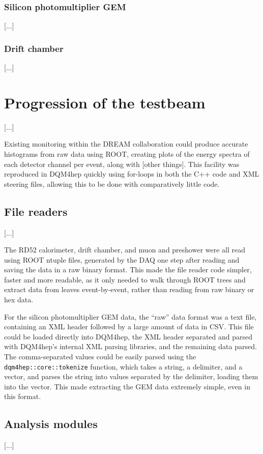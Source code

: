 \subsubsection{Silicon photomultiplier GEM}
[...]

\subsubsection{Drift chamber}
[...]

\section{Progression of the testbeam} %
[...]

Existing monitoring within the DREAM collaboration could produce accurate histograms from raw data using ROOT, creating plots of the energy spectra of each detector channel per event, along with [other things]. This facility was reproduced in DQM4hep quickly using for-loops in both the C++ code and XML steering files, allowing this to be done with comparatively little code.

\subsection{File readers}
[...]

The RD52 calorimeter, drift chamber, and muon and preshower were all read using ROOT ntuple files, generated by the DAQ one step after reading and saving the data in a raw binary format. This made the file reader code simpler, faster and more readable, as it only needed to walk through ROOT trees and extract data from leaves event-by-event, rather than reading from raw binary or hex data.

For the silicon photomultiplier GEM data, the ``raw'' data format was a text file, containing an \acrshort{XML} header followed by a large amount of data in \acrfull{CSV}. This file could be loaded directly into DQM4hep, the XML header separated and parsed with DQM4hep's internal XML parsing libraries, and the remaining data parsed. The comma-separated values could be easily parsed using the \texttt{dqm4hep::core::tokenize} function, which takes a string, a delimiter, and a vector, and parses the string into values separated by the delimiter, loading them into the vector. This made extracting the GEM data extremely simple, even in this format.

\subsection{Analysis modules}
[...]

